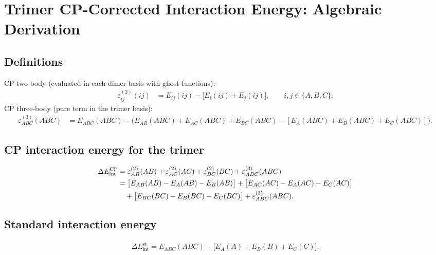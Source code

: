 
\section{Trimer CP-Corrected Interaction Energy: Algebraic Derivation}
\label{app:trimer-cp-derivation}

\subsection*{Definitions}
CP two-body (evaluated in each dimer basis with ghost functions):
\begin{align}
\varepsilon_{ij}^{(2)}(ij)
&= E_{ij}(ij) - \big[E_i(ij)+E_j(ij)\big],
\qquad i,j \in \{A,B,C\}.
\label{app:eq:cp-dimer}
\end{align}
CP three-body (pure term in the trimer basis):
\begin{align}
\varepsilon_{ABC}^{(3)}(ABC)
&= E_{ABC}(ABC)
 - \Big( E_{AB}(ABC)+E_{AC}(ABC)+E_{BC}(ABC)
 - [E_A(ABC)+E_B(ABC)+E_C(ABC)] \Big).
\label{app:eq:cp-three}
\end{align}

\subsection*{CP interaction energy for the trimer}
\begin{align}
\Delta E_{\mathrm{int}}^{\mathrm{CP}}
&= \varepsilon_{AB}^{(2)}(AB) + \varepsilon_{AC}^{(2)}(AC) + \varepsilon_{BC}^{(2)}(BC)
   + \varepsilon_{ABC}^{(3)}(ABC) \notag\\
&= \big[ E_{AB}(AB) - E_A(AB) - E_B(AB) \big]
 + \big[ E_{AC}(AC) - E_A(AC) - E_C(AC) \big] \notag\\
&\quad + \big[ E_{BC}(BC) - E_B(BC) - E_C(BC) \big]
 + \varepsilon_{ABC}^{(3)}(ABC).
\label{app:eq:cp-trimer}
\end{align}

\subsection*{Standard interaction energy}
\begin{align}
\Delta E_{\mathrm{int}}^{\mathrm{st}}
= E_{ABC}(ABC) - \big[ E_A(A)+E_B(B)+E_C(C) \big].
\label{app:eq:std-trimer}
\end{align}

